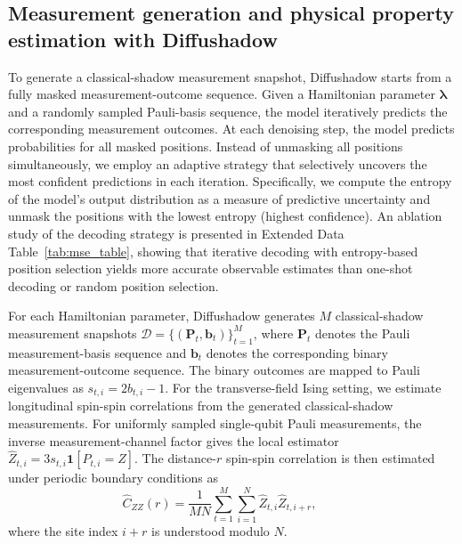 \documentclass[pdflatex,sn-mathphys-num]{sn-jnl}%
\theoremstyle{thmstyleone}%
\theoremstyle{thmstyletwo}%
\theoremstyle{thmstylethree}%
\begin{document}
\subsection{Measurement generation and physical property estimation with Diffushadow}


To generate a classical-shadow measurement snapshot, Diffushadow starts from a fully masked measurement-outcome sequence. Given a Hamiltonian parameter \(\boldsymbol{\lambda}\) and a randomly sampled Pauli-basis sequence, the model iteratively predicts the corresponding measurement outcomes. At each denoising step, the model predicts probabilities for all masked positions. Instead of unmasking all positions simultaneously, we employ an adaptive strategy that selectively uncovers the most confident predictions in each iteration. Specifically, we compute the entropy of the model's output distribution as a measure of predictive uncertainty and unmask the positions with the lowest entropy (highest confidence). An ablation study of the decoding strategy is presented in Extended Data Table~\ref{tab:mse_table}, showing that iterative decoding with entropy-based position selection yields more accurate observable estimates than one-shot decoding or random position selection.






For each Hamiltonian parameter, Diffushadow generates \(M\) classical-shadow measurement snapshots \(\mathcal{D}=\{(\mathbf{P}_t,\mathbf{b}_t)\}_{t=1}^{M}\), where \(\mathbf{P}_t\) denotes the Pauli measurement-basis sequence and \(\mathbf{b}_t\) denotes the corresponding binary measurement-outcome sequence. The binary outcomes are mapped to Pauli eigenvalues as \(s_{t,i}=2b_{t,i}-1\). For the transverse-field Ising setting, we estimate longitudinal spin-spin correlations from the generated classical-shadow measurements. For uniformly sampled single-qubit Pauli measurements, the inverse measurement-channel factor gives the local estimator \(\widehat{Z}_{t,i}=3s_{t,i}\mathbf{1}[P_{t,i}=Z]\). The distance-\(r\) spin-spin correlation is then estimated under periodic boundary conditions as
\begin{equation}
\widehat{C}_{ZZ}(r)
=
\frac{1}{MN}
\sum_{t=1}^{M}
\sum_{i=1}^{N}
\widehat{Z}_{t,i}
\widehat{Z}_{t,i+r},
\qquad
\end{equation}
where the site index $i+r$ is understood modulo $N$.
\end{document}

